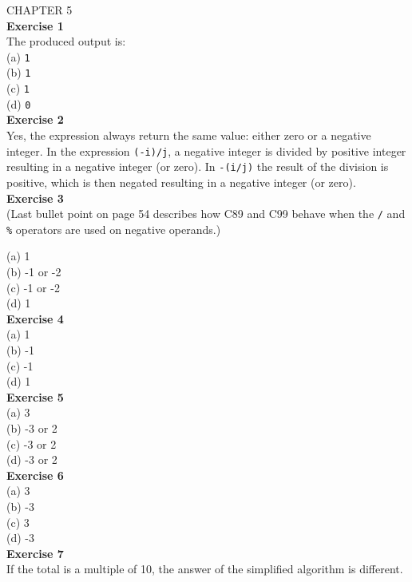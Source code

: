 \documentclass[a4paper, 10pt]{article}
\begin{document}
{\LARGE CHAPTER 5} \\

\textbf{Exercise 1} \\
The produced output is: \\
(a) \texttt{1} \\ 
(b) \texttt{1} \\
(c) \texttt{1} \\
(d) \texttt{0} \\

\textbf{Exercise 2} \\
Yes, the expression always return the same value: either zero or a negative integer. In the expression \texttt{(-i)/j}, a negative integer is divided by positive integer resulting in a negative integer (or zero). In \texttt{-(i/j)} the result of the division is positive, which is then negated resulting in a negative integer (or zero). \\

\textbf{Exercise 3} \\
(Last bullet point on page 54 describes how C89 and C99 behave when the \texttt{/} and \texttt{\%} operators are used on negative operands.) 

(a) 1 \\
(b) -1 or -2 \\
(c) -1 or -2 \\
(d) 1 \\

\textbf{Exercise 4} \\
(a) 1 \\
(b) -1 \\
(c) -1 \\
(d) 1 \\

\textbf{Exercise 5} \\
(a) 3 \\
(b) -3 or 2 \\
(c) -3 or 2 \\
(d) -3 or 2 \\

\textbf{Exercise 6} \\
(a) 3 \\
(b) -3 \\
(c) 3 \\
(d) -3 \\

\textbf{Exercise 7} \\
If the total is a multiple of 10, the answer of the simplified algorithm is different. \\
\end{document}
